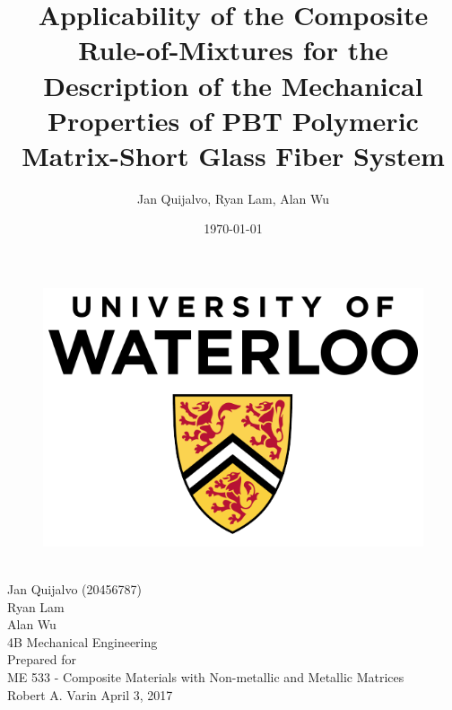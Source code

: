 \documentclass[11pt]{article}
\begin{document}
\doublespacing

\title{\textbf{Applicability of the Composite Rule-of-Mixtures for the Description of the Mechanical Properties of PBT Polymeric Matrix-Short Glass Fiber System}}
\author{Jan Quijalvo, Ryan Lam, Alan Wu}
\date{\today}


\makeatletter
    \singlespacing
    \begin{titlepage}
        \begin{center}
        	\begin{figure}[h]
        	\centering
            \includegraphics[scale=0.3]{./figures/University-of-Waterloo}
            \end{figure}
            \vspace{20mm}
            {\huge \bfseries  \@title }\\[2ex] 
            \vspace{5mm}
            {\LARGE Jan Quijalvo (20456787)}\\
            \vspace{2mm}
            {\LARGE Ryan Lam}\\
            \vspace{2mm}
            {\LARGE Alan Wu}\\
            \vspace{2mm}
            \LARGE 4B Mechanical Engineering\\[12ex]
            Prepared for\\
            ME 533 - Composite Materials with Non-metallic and Metallic Matrices\\
            Robert A. Varin
            \centering
            \vfill
            {\large April 3, 2017}
        \end{center}
    \end{titlepage}
\makeatother
\end{document}
